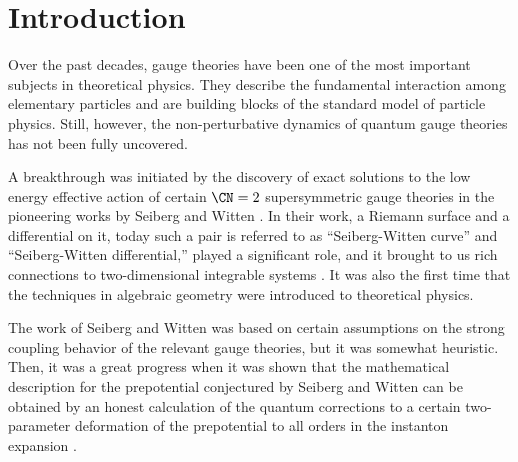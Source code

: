 \begin{comment}
\documentclass[11pt]{article}  %
\usepackage{Common/toshi}

\end{comment}



\section{Introduction}
\label{sec:intro}


Over the past decades, gauge theories have been one of the most
important subjects in theoretical physics.
They describe the fundamental interaction among elementary particles
and are building blocks of the standard model of particle physics.
Still, however, the non-perturbative dynamics of quantum gauge theories
has not been fully uncovered.

A breakthrough was initiated by the discovery of exact solutions to
the low energy effective action of certain $\CN=2$ supersymmetric gauge
theories in the pioneering works by Seiberg and Witten \cite{Seiberg:1994rs,Seiberg:1994aj}.
In their work, a Riemann surface and a differential on it, today such a pair is referred to as
``Seiberg-Witten curve'' and ``Seiberg-Witten differential,'' played a significant role, and it brought to us
rich connections to two-dimensional integrable systems \cite{Gorsky:1995zq,Martinec:1995by,Donagi:1995cf,Itoyama:1995nv}.
It was also the first time that the techniques in algebraic geometry were introduced
to theoretical physics.

The work of Seiberg and Witten was based on certain assumptions on the strong coupling
behavior of the relevant gauge theories, but it was somewhat heuristic.
Then, it was a great progress when it was shown that the mathematical description for
the prepotential conjectured by Seiberg and Witten can be obtained by an honest
calculation of the quantum corrections to a certain two-parameter
deformation of the prepotential to all orders in the instanton
expansion \cite{Nekrasov:2002qd,Nekrasov:2003rj,Nakajima:2003pg}.

